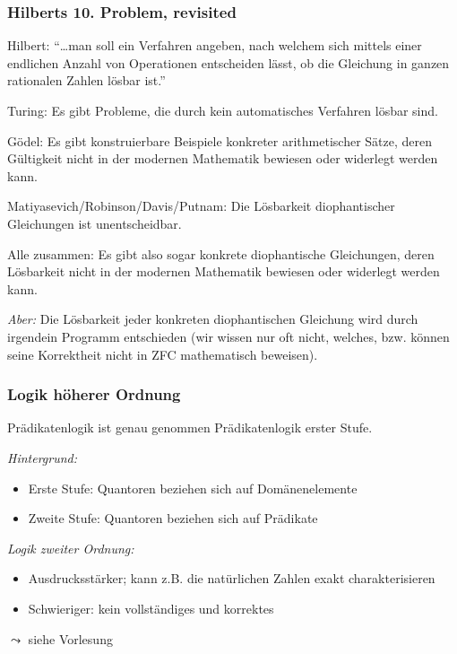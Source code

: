 \documentclass[aspectratio=1610,onlymath]{beamer}
\begin{document}
\begin{frame}\frametitle{Hilberts 10. Problem, revisited}

\alert{Hilbert:} "`\ldots man soll ein Verfahren angeben, nach welchem sich mittels einer endlichen Anzahl von Operationen entscheiden lässt, ob die Gleichung in ganzen rationalen Zahlen lösbar ist."'
\bigskip\pause

\alert{Turing:} Es gibt Probleme, die durch kein automatisches Verfahren lösbar sind.
\medskip\pause

\alert{Gödel:} Es gibt konstruierbare Beispiele konkreter arithmetischer Sätze, deren Gültigkeit nicht in der modernen Mathematik bewiesen oder widerlegt werden kann.
\medskip\pause

\alert{Matiyasevich/Robinson/Davis/Putnam:} Die Lösbarkeit diophantischer Gleichungen ist
unentscheidbar.
\medskip\pause

\alert{Alle zusammen:} Es gibt also sogar konkrete diophantische Gleichungen, deren Lösbarkeit nicht in der modernen Mathematik bewiesen oder widerlegt werden kann.\medskip\pause

{\tiny
\emph{Aber:} Die Lösbarkeit jeder konkreten diophantischen Gleichung wird durch irgendein Programm entschieden (wir wissen nur oft nicht, welches, bzw. können seine Korrektheit nicht in ZFC mathematisch beweisen).

}

\end{frame}



\begin{frame}\frametitle{Logik höherer Ordnung}

Prädikatenlogik ist genau genommen \alert{Prädikatenlogik erster Stufe}.
\bigskip

\emph{Hintergrund:}
\begin{itemize}
\item Erste Stufe: Quantoren beziehen sich auf Domänenelemente\smallskip

\item Zweite Stufe: Quantoren beziehen sich auf Prädikate\smallskip

\end{itemize}\bigskip

\emph{Logik zweiter Ordnung:}
\begin{itemize}
\item Ausdrucksstärker; kann z.B. die natürlichen Zahlen exakt charakterisieren
\item Schwieriger: kein vollständiges und korrektes 
\end{itemize}

$\leadsto$ siehe Vorlesung 

\end{frame}
\end{document}

